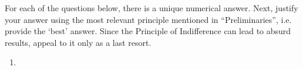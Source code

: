 \documentclass[12pt,letterpaper]{article}
\begin{document}
\begin{enumerate}
{For each of the questions below, there is a unique numerical answer. Next, justify your answer using the most relevant principle mentioned in ``Preliminaries'', i.e. provide the `best' answer. Since the Principle of Indifference can lead to absurd results, appeal to it only as a last resort. 

 
}
   
  
\begin{enumerate}

\item \label{ex:ur} 

\end{enumerate}
\end{enumerate}
\end{document}
